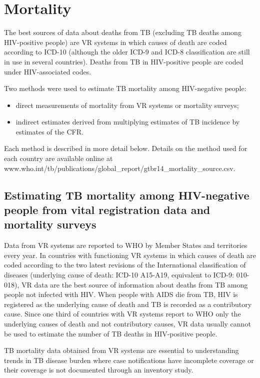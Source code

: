 \section{Mortality}

The best sources of data about deaths from TB (excluding TB deaths among HIV-positive people) are VR systems in which causes of death are coded according to ICD-10 (although the older ICD-9 and ICD-8 classification are still in use in several countries). Deaths from TB in HIV-positive people are coded under HIV-associated codes. 

Two methods were used to estimate TB mortality among HIV-negative people: 
\begin{itemize}
\item direct measurements of mortality from VR systems or mortality surveys;
\item indirect estimates derived from multiplying estimates of TB incidence by estimates of the CFR. 
\end{itemize}

Each method is described in more detail below. Details on the method used for each country are available online at www.who.int/tb/publications/global_report/gtbr14_mortality_source.csv.

\subsection{Estimating TB mortality among HIV-negative people from vital registration data and mortality surveys}

Data from VR systems are reported to WHO by Member States and territories every year. In countries with functioning VR systems in which causes of death are coded according to the two latest revisions of the International classification of diseases (underlying cause of death: ICD-10 A15-A19, equivalent to ICD-9: 010-018), VR data are the best source of information about deaths from TB among people not infected with HIV. When people with AIDS die from TB, HIV is registered as the underlying cause of death and TB is recorded as a contributory cause. Since one third of countries with VR systems report to WHO only the underlying causes of death and not contributory causes, VR data usually cannot be used to estimate the number of TB deaths in HIV-positive people. 

TB mortality data obtained from VR systems are essential to understanding trends in TB disease burden where case notifications have incomplete coverage or their coverage is not documented through an inventory study. 

